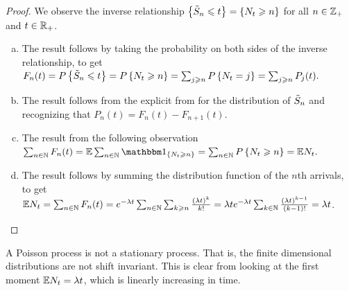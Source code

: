 \documentclass[letterpaper,10pt,english]{article}
\begin{document}
\begin{proof}
We observe the inverse relationship $\left\{\tilde{S}_n \leqslant t\right\} = \left\{N_t \geqslant n\right\}$ for all $n \in \mathbb{Z}_+$ and $t\in\mathbb{R}_+$.  
\begin{enumerate}[(a)]
\item The result follows by taking the probability on both sides of the inverse relationship, to get  
$
F_n(t)  
= P\left\{\tilde{S}_n \leqslant t\right\} 
= P\left\{N_t \geqslant n\right\}  
= \sum_{j \geqslant n}P\left\{N_t = j\right\}
= \sum_{j \geqslant n}P_j(t).
$
\item The result follows from the explicit from for the distribution of $\tilde{S}_n$ and recognizing that $P_n(t) = F_n(t) - F_{n+1}(t)$. 
\item The result from the following observation
$
\sum_{n \in \N}F_n(t) = \E\sum_{n \in \N}\SetIn{N_t \ge n} = \sum_{n \in \N}P\set{N_t \ge n} = \E N_t.
$
\item The result follows by summing the distribution function of the $n$th arrivals, to get 
$\mathbb{E} N_t = \sum_{n\in\mathbb{N}}F_n(t) = e^{-\lambda t}\sum_{n\in\mathbb{N}}\sum_{k \geqslant n}\frac{(\lambda t)^k}{k!} = 
\lambda t e^{-\lambda t}\sum_{k\in\mathbb{N}}\frac{(\lambda t)^{k-1}}{(k-1)!} = \lambda t$. 
\end{enumerate}
\end{proof}

\begin{rem} 
A Poisson process is not a stationary process. 
That is, the finite dimensional distributions are not shift invariant. 
This is clear from looking at the first moment $\mathbb{E} N_t = \lambda t$, which is linearly increasing in time. 
\end{rem}
\end{document}
